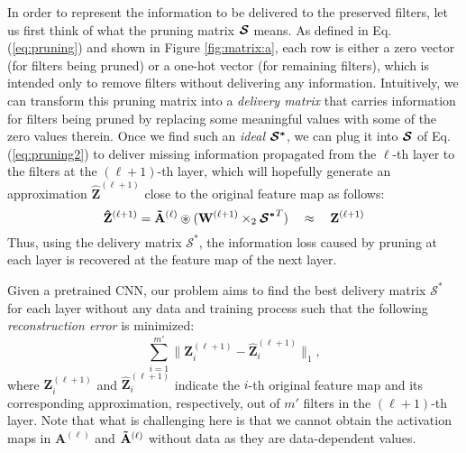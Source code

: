 In order to represent the information to be delivered to the preserved filters, let us first think of what the pruning matrix $\boldsymbol{\S}$ means. As defined in Eq. (\ref{eq:pruning}) and shown in Figure \ref{fig:matrix:a}, each row is either a zero vector (for filters being pruned) or a one-hot vector (for remaining filters), which is intended only to remove filters without delivering any information. Intuitively, we can transform this pruning matrix into a \textit{delivery matrix} that carries information for filters being pruned by replacing some meaningful values with some of the zero values therein. Once we find such an \textit{ideal} $\boldsymbol{\S^*}$, we can plug it into $\boldsymbol{\S}$ of Eq. (\ref{eq:pruning2}) to deliver missing information propagated from the $\ell$-th layer to the filters at the $(\ell+1)$-th layer, which will hopefully generate an approximation $\mathbf{\hat{Z}}^{(\ell+1)}$ close to the original feature map as follows:
\begin{equation} \label{eq:fmap_approx}
{\mathbf{\hat{Z}}}^{{(\ell+1)}} = {\mathbf{\Tilde{A}}^{(\ell)} \circledast ({\mathbf{W}}^{(\ell+1)} \times_{2} {\boldsymbol{\S^*}^T})}
~~~\approx~~~\mathbf{Z}^{(\ell+1)}
\end{equation}
Thus, using the delivery matrix $\boldsymbol{\mathcal{S^*}}$, the information loss caused by pruning at each layer is recovered at the feature map of the next layer.

Given a pretrained CNN, our problem aims to find the best delivery matrix $\boldsymbol{\mathcal{S^*}}$ for each layer without any data and training process such that the following \textit{reconstruction error} is minimized:
\begin{equation}
\sum\limits_{i = 1}^{m'}\|{{\mathbf{Z}}_{i}^{{(\ell+1)}}-{\hat{\mathbf{Z}}}_{i}^{{(\ell+1)}}}\|_1,
\label{eq:goal}
\end{equation}
where ${\mathbf{Z}}_i^{{(\ell+1)}}$ and ${\hat{\mathbf{Z}}}_i^{{(\ell+1)}}$ indicate the $i$-th original feature map and its corresponding approximation, respectively, out of $m'$ filters in the $(\ell+1)$-th layer. Note that what is challenging here is that we cannot obtain the activation maps in $\mathbf{A}^{(\ell)}$ and $\mathbf{\Tilde{A}}^{(\ell)}$ without data as they are data-dependent values.




